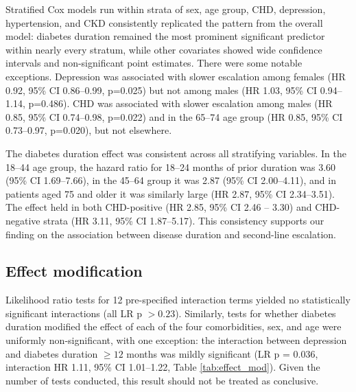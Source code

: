 \documentclass[twoside,11pt]{article}
\begin{document}
Stratified Cox models run within strata of sex, age group, CHD, depression, hypertension, and CKD consistently replicated the pattern from the overall model: diabetes duration remained the most prominent significant predictor within nearly every stratum, while other covariates showed wide confidence intervals and non-significant point estimates. There were some notable exceptions. Depression was associated with slower escalation among females (HR 0.92, 95\% CI 0.86–0.99, p=0.025) but not among males (HR 1.03, 95\% CI 0.94–1.14, p=0.486). CHD was associated with slower escalation among males (HR 0.85, 95\% CI 0.74–0.98, p=0.022) and in the 65–74 age group (HR 0.85, 95\% CI 0.73–0.97, p=0.020), but not elsewhere.

The diabetes duration effect was consistent across all stratifying variables. In the 18–44 age group, the hazard ratio for 18–24 months of prior duration was 3.60 (95\% CI 1.69–7.66), in the 45–64 group it was 2.87 (95\% CI 2.00–4.11), and in patients aged 75 and older it was similarly large (HR 2.87, 95\% CI 2.34–3.51). The effect held in both CHD-positive (HR 2.85, 95\% CI 2.46 -- 3.30) and CHD-negative strata (HR 3.11, 95\% CI 1.87–5.17). This consistency supports our finding on the association between disease duration and second-line escalation.

\subsection*{Effect modification}

Likelihood ratio tests for 12 pre-specified interaction terms yielded no statistically significant interactions (all LR p $> 0.23$). Similarly, tests for whether diabetes duration modified the effect of each of the four comorbidities, sex, and age were uniformly non-significant, with one exception: the interaction between depression and diabetes duration $\geq 12$ months was mildly significant (LR p = 0.036, interaction HR 1.11, 95\% CI 1.01--1.22, Table \ref{tab:effect_mod}). Given the number of tests conducted, this result should not be treated as conclusive.
\end{document}

